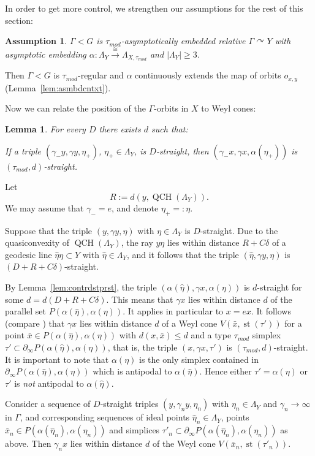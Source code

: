 \documentclass[12pt]{article}
\theoremstyle{boldplain}
\newtheorem{ass}[equation]{Assumption}
\newtheorem{lemma}[equation]{Lemma}
\theoremstyle{bolddefinition}
\numberwithin{equation}{section}
\def\al{\alpha}
\def\ga{\gamma}
\def\Ga{\Gamma}
\def\de{\delta}
\def\La{\Lambda}
\def\acts{\curvearrowright}
\def\QCH{\operatorname{QCH}}
\def\geo{\partial_{\infty}}
\def\LaXt{\Lambda_{X,\tau_{mod}}}
\def\LaY{\Lambda_Y}
\def\st{\operatorname{st}}
\def\taumod{\tau_{mod}}
\begin{document}
\medskip
In order to get more control,
we strengthen our assumptions for the rest of this section:
\begin{ass}
\label{ass:rlsmbd}
$\Ga<G$ is {\em $\taumod$-asymptotically embedded} relative $\Ga\acts Y$ 
with asymptotic embedding $\al:\LaY\stackrel{\cong}{\to}\LaXt$ 
and $|\LaY|\geq3$.
\end{ass}

Then $\Ga<G$ is $\taumod$-regular
and $\al$ continuously extends the map of orbits $o_{x,y}$ (Lemma~\ref{lem:asmbdcntxt}).

Now we can relate the position of the $\Ga$-orbits in $X$ to Weyl cones:
\begin{lemma}\label{lem:cntrldstwcn}
For every $D$ there exists $d$ such that: 

If a triple $(\ga_-y,\ga y,\eta_+)$, $\eta_+\in\La_Y$, is $D$-straight, 
then $(\ga_-x,\ga x,\al(\eta_+))$ is $(\taumod,d)$-straight.
\end{lemma}
\proof Let $$R:=d(y, \QCH(\LaY)).$$
We may assume that $\ga_-=e$, and denote $\eta_+=:\eta$.

Suppose that the triple $(y,\ga y,\eta)$ with $\eta\in\La_Y$ is $D$-straight.
Due to the quasiconvexity of $\QCH(\LaY)$,
the ray $y\eta$ lies within distance $R+C\de$
of a geodesic line $\hat\eta\eta\subset Y$ with $\hat\eta\in\La_Y$,
and it follows that the triple $(\hat\eta,\ga y,\eta)$ is $(D+R+C\delta)$-straight. 

By Lemma~\ref{lem:contrdstprst},
the triple $(\al(\hat\eta),\ga x,\al(\eta))$ is $d$-straight for some $d=d(D+R+C\delta)$.
This means that $\ga x$ lies within distance $d$ of the parallel set $P(\al(\hat\eta),\al(\eta))$.
It applies in particular to $x=ex$. 
It follows (compare \cite[Dichotomy Lemma 5.5 and Proposition 5.16]{anolec}) 
that $\ga x$ lies within distance $d$ of a Weyl cone $V(\bar x,\st(\tau'))$
for a point $\bar x\in P(\al(\hat\eta),\al(\eta))$ with $d(x,\bar x)\leq d$
and a type $\taumod$ simplex $\tau'\subset\geo P(\al(\hat\eta),\al(\eta))$,
that is,
the triple $(x,\ga x,\tau')$ is $(\taumod,d)$-straight.
It is important to note that $\al(\eta)$ is the only simplex contained in $\geo P(\al(\hat\eta),\al(\eta))$ which is antipodal to $\al(\hat\eta)$.
Hence either $\tau'=\al(\eta)$ or $\tau'$ is {\em not} antipodal to $\al(\hat\eta)$.

Consider a sequence of $D$-straight triples $(y,\ga_n y,\eta_n)$ with $\eta_n\in\La_Y$
and $\ga_n\to\infty$ in $\Ga$,
and corresponding sequences of ideal points $\hat\eta_n\in\LaY$, points $\bar x_n\in P(\al(\hat\eta_n),\al(\eta_n))$ 
and simplices $\tau'_n\subset\geo P(\al(\hat\eta_n),\al(\eta_n))$ 
as above.
Then $\ga_n x$ lies within distance $d$ of the Weyl cone $V(\bar x_n,\st(\tau'_n))$.
\end{document}

